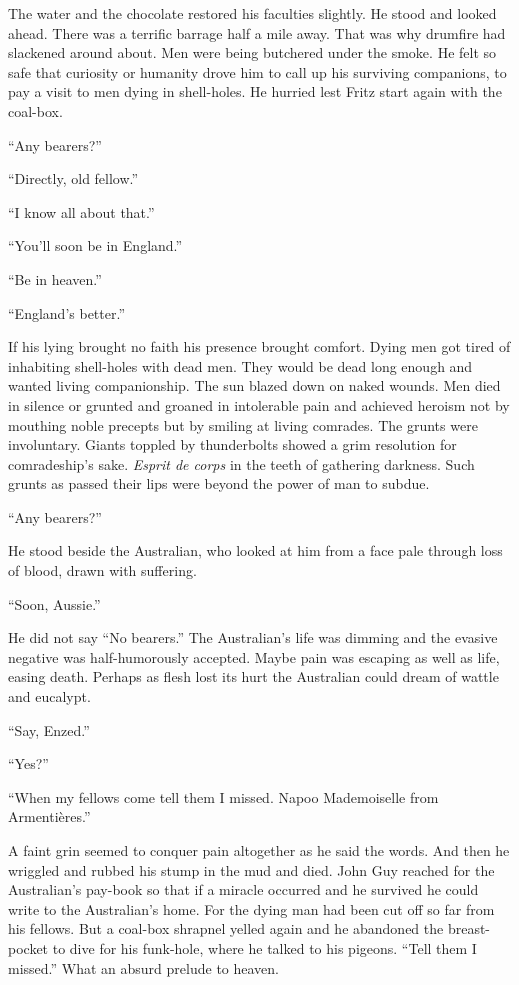 The water and the chocolate restored his faculties slightly. He stood and looked ahead. There was a terrific barrage half a mile away. That was why drumfire had slackened around about. Men were being butchered under the smoke. He felt so safe that curiosity or humanity drove him to call up his surviving companions, to pay a visit to men dying in shell-holes. He hurried lest Fritz start again with the coal-box.

``Any bearers?''

``Directly, old fellow.''

``I know all about that.''

``You'll soon be in England.''

``Be in heaven.''

``England's better.''

If his lying brought no faith his presence brought comfort. Dying men got tired of inhabiting shell-holes with dead men. They would be dead long enough and wanted living companionship. The sun blazed down on naked wounds. Men died in silence or grunted and groaned in intolerable pain and achieved heroism not by mouthing noble precepts but by smiling at living comrades. The grunts were involuntary. Giants toppled by thunderbolts showed a grim resolution for comradeship's sake. \emph{Esprit de corps} in the teeth of gathering darkness. Such grunts as passed their lips were beyond the power of man to subdue.

``Any bearers?''

He stood beside the Australian, who looked at him from a face pale through loss of blood, drawn with suffering.

``Soon, Aussie.''

He did not say ``No bearers.'' The Australian's life was dimming and the evasive negative was half-humorously accepted. Maybe pain was escaping as well as life, easing death. Perhaps as flesh lost its hurt the Australian could dream of wattle and eucalypt.

``Say, Enzed.''

``Yes?''

``When my fellows come tell them I missed. Napoo Mademoiselle from Armenti\`{e}res.''

A faint grin seemed to conquer pain altogether as he said the words. And then he wriggled and rubbed his stump in the mud and died. John Guy reached for the Australian's pay-book so that if a miracle occurred and he survived he could write to the Australian's home. For the dying man had been cut off so far from his fellows. But a coal-box shrapnel yelled again and he abandoned the breast-pocket to dive for his funk-hole, where he talked to his pigeons. ``Tell them I missed.'' What an absurd prelude to heaven.

